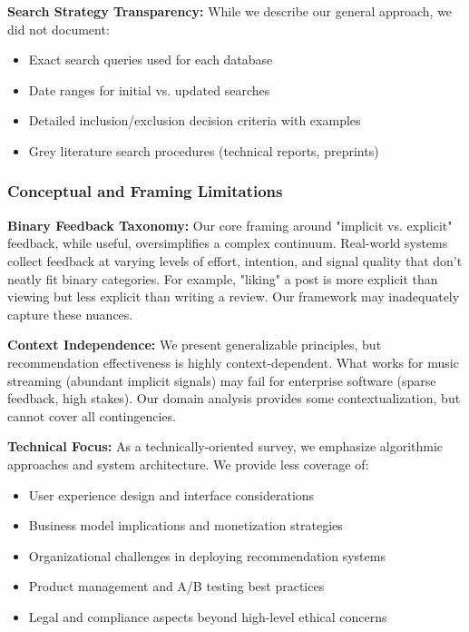 \textbf{Search Strategy Transparency:} While we describe our general approach, we did not document:
\begin{itemize}
    \item Exact search queries used for each database
    \item Date ranges for initial vs. updated searches
    \item Detailed inclusion/exclusion decision criteria with examples
    \item Grey literature search procedures (technical reports, preprints)
\end{itemize}

\subsubsection{Conceptual and Framing Limitations}

\textbf{Binary Feedback Taxonomy:} Our core framing around "implicit vs. explicit" feedback, while useful, oversimplifies a complex continuum. Real-world systems collect feedback at varying levels of effort, intention, and signal quality that don't neatly fit binary categories. For example, "liking" a post is more explicit than viewing but less explicit than writing a review. Our framework may inadequately capture these nuances.

\textbf{Context Independence:} We present generalizable principles, but recommendation effectiveness is highly context-dependent. What works for music streaming (abundant implicit signals) may fail for enterprise software (sparse feedback, high stakes). Our domain analysis provides some contextualization, but cannot cover all contingencies.

\textbf{Technical Focus:} As a technically-oriented survey, we emphasize algorithmic approaches and system architecture. We provide less coverage of:
\begin{itemize}
    \item User experience design and interface considerations
    \item Business model implications and monetization strategies
    \item Organizational challenges in deploying recommendation systems
    \item Product management and A/B testing best practices
    \item Legal and compliance aspects beyond high-level ethical concerns
\end{itemize}

